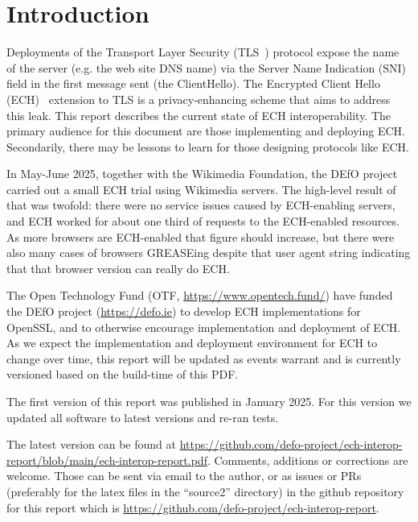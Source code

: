 \section{Introduction}

Deployments of the Transport Layer Security (TLS~\cite{rfc8446}) protocol
expose the name of the server (e.g. the web site DNS name) via the Server Name
Indication (SNI) field in the first message sent (the ClientHello).  The
Encrypted Client Hello (ECH)~\cite{ietf-tls-esni} extension to TLS is a
privacy-enhancing scheme that aims to address this leak.
This report describes the current state of ECH interoperability.
The primary audience for this document are those implementing and
deploying ECH. Secondarily, there may be lessons to learn for those
designing protocols like ECH.

In May-June 2025, together with the Wikimedia Foundation, the DEfO
project carried out a small ECH trial using Wikimedia servers.\cite{echtrial}
The high-level result of that was twofold: there were no service issues
caused by ECH-enabling servers, and ECH worked for about one third of
requests to the ECH-enabled resources. As more browsers are ECH-enabled
that figure should increase, but there were also many cases of browsers
GREASEing despite that user agent string indicating that that browser
version can really do ECH.

The Open Technology Fund (OTF, \url{https://www.opentech.fund/}) have
funded the DEfO project (\url{https://defo.ie}) to develop
ECH implementations for OpenSSL, and to otherwise encourage implementation
and deployment of ECH.
As we expect the implementation and deployment environment for ECH to change
over time, this report will be updated as events warrant and is currently
versioned based on the build-time of this PDF.

The first version of this report was published in January 2025. \cite{echinterop1}
For this version we updated all software to latest versions and re-ran tests.

The latest version can be found at
\url{https://github.com/defo-project/ech-interop-report/blob/main/ech-interop-report.pdf}.
Comments, additions or corrections are welcome. Those can be sent via email to
the author, or as issues or PRs (preferably for the latex files in the
``source2'' directory) in the github repository for this report which is
\url{https://github.com/defo-project/ech-interop-report}.
